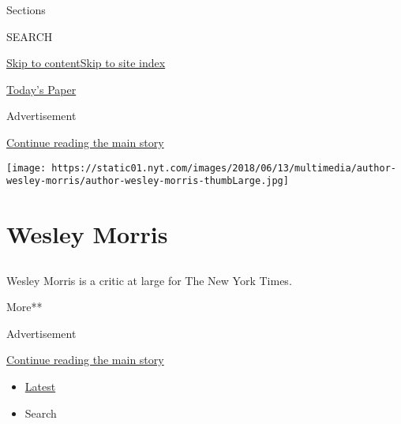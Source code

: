 Sections

SEARCH

\protect\hyperlink{site-content}{Skip to
content}\protect\hyperlink{site-index}{Skip to site index}

\href{https://myaccount.nytimes.com/auth/login?response_type=cookie\&client_id=vi}{}

\href{https://www.nytimes.com/section/todayspaper}{Today's Paper}

Advertisement

\protect\hyperlink{after-top}{Continue reading the main story}

\texttt{[image: https://static01.nyt.com/images/2018/06/13/multimedia/author-wesley-morris/author-wesley-morris-thumbLarge.jpg]}

\hypertarget{wesley-morris}{%
\section{Wesley Morris}\label{wesley-morris}}

\subsection{}

Wesley Morris is a critic at large for The New York Times.

More**

Advertisement

\protect\hyperlink{after-mid1}{Continue reading the main story}

\begin{itemize}
\tightlist
\item
  \protect\hyperlink{stream-panel}{Latest}
\item
  Search
\end{itemize}

